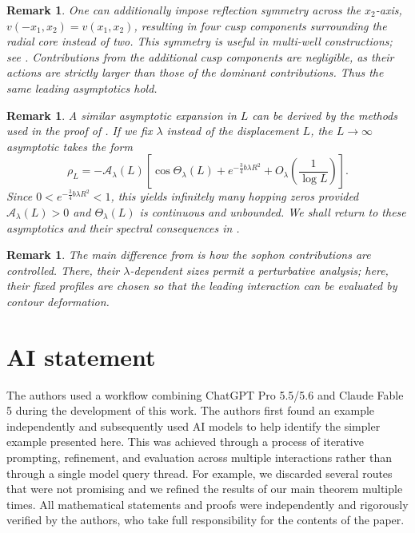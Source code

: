 \documentclass[11pt]{article}
\newtheorem{remark}[theorem]{Remark}
\newcommand{\cA}{\mathcal A}
\begin{document}
\begin{remark}
One can additionally impose reflection symmetry across the $x_2$-axis,
$v(-x_1,x_2)=v(x_1,x_2)$, resulting in four cusp components surrounding the
radial core instead of two. This symmetry is useful in multi-well
constructions; see \cite{FSW-PNAS}. Contributions from the additional cusp
components are negligible, as their actions are strictly larger than those
of the dominant contributions. Thus the same leading asymptotics hold.
\end{remark}

\begin{remark}
A similar asymptotic expansion in $L$ can be derived by the methods used
in the proof of . If we fix $\lambda$ instead of the
displacement $L$, the $L\to\infty$ asymptotic takes the form
\[
 \rho_L=-\cA_\lambda(L)\left[
 \cos\Theta_\lambda(L)+e^{-\frac34 b\lambda R^2}
 +O_\lambda\!\left(\frac{1}{\log L}\right)\right].
\]
Since $0<e^{-\frac34 b\lambda R^2}<1$, this yields infinitely many hopping
zeros provided $\cA_\lambda(L)>0$ and $\Theta_\lambda(L)$ is continuous and
unbounded. We shall return to these asymptotics and their spectral
consequences in \cite{FKSW-large-separation}.
\end{remark}


\begin{remark}
The main difference from \cite{FSW-absence} is how the sophon contributions
are controlled. There, their $\lambda$-dependent sizes permit a perturbative
analysis; here, their fixed profiles are chosen so that the leading
interaction can be evaluated by contour deformation.
\end{remark}


\section*{AI statement}
The authors used a workflow combining ChatGPT Pro 5.5/5.6 and Claude Fable 5 during the development of this work. The authors first found an example independently and subsequently used AI models to help identify the simpler example presented here. This was achieved through a process of iterative prompting, refinement, and evaluation across multiple interactions rather than through a single model query thread. For example, we discarded several routes that were not promising and we refined the results of our main theorem multiple times. All mathematical statements and proofs were independently and rigorously verified by the authors, who take full responsibility for the contents of the paper.
\end{document}
